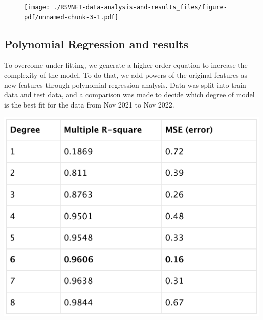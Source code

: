 \documentclass[
  letterpaper,
  DIV=11,
  numbers=noendperiod]{scrreport}
\begin{document}
\begin{figure}[H]

{\centering \texttt{[image: ./RSVNET-data-analysis-and-results\_files/figure-pdf/unnamed-chunk-3-1.pdf]}

}

\end{figure}

\hypertarget{polynomial-regression-and-results}{%
\subsection{Polynomial Regression and
results}\label{polynomial-regression-and-results}}

To overcome under-fitting, we generate a higher order equation to
increase the complexity of the model. To do that, we add powers of the
original features as new features through polynomial regression
analysis. Data was split into train data and test data, and a comparison
was made to decide which degree of model is the best fit for the data
from Nov 2021 to Nov 2022.

\includegraphics[width=5.98958in,height=\textheight]{./images/paste-99DEEB9C.png}
\end{document}
